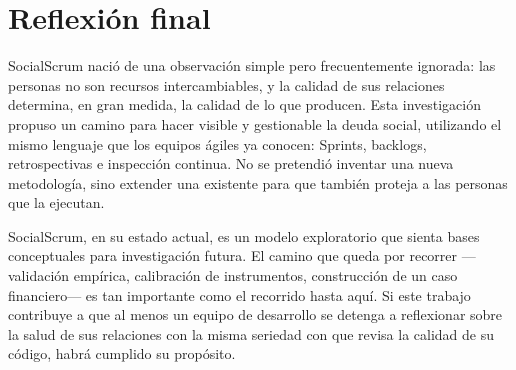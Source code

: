 \section{Reflexión final}
\label{sec:reflexion-final}

SocialScrum nació de una observación simple pero frecuentemente ignorada: las personas no son recursos intercambiables, y la calidad de sus relaciones determina, en gran medida, la calidad de lo que producen. Esta investigación propuso un camino para hacer visible y gestionable la deuda social, utilizando el mismo lenguaje que los equipos ágiles ya conocen: Sprints, backlogs, retrospectivas e inspección continua. No se pretendió inventar una nueva metodología, sino extender una existente para que también proteja a las personas que la ejecutan.

SocialScrum, en su estado actual, es un modelo exploratorio que sienta bases conceptuales para investigación futura. El camino que queda por recorrer ---validación empírica, calibración de instrumentos, construcción de un caso financiero--- es tan importante como el recorrido hasta aquí. Si este trabajo contribuye a que al menos un equipo de desarrollo se detenga a reflexionar sobre la salud de sus relaciones con la misma seriedad con que revisa la calidad de su código, habrá cumplido su propósito.
